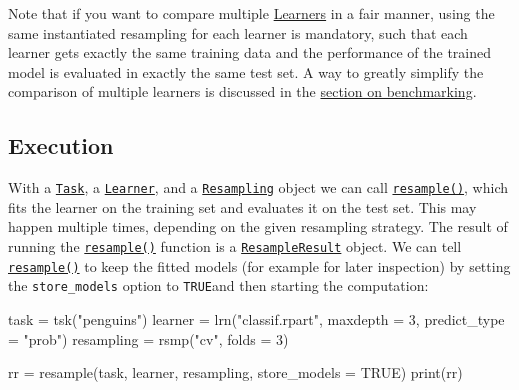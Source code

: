 \documentclass[
]{scrbook}
\newenvironment{Shaded}{\begin{snugshade}}{\end{snugshade}}
\newcommand{\AttributeTok}[1]{\textcolor[rgb]{0.77,0.63,0.00}{#1}}
\newcommand{\ConstantTok}[1]{\textcolor[rgb]{0.00,0.00,0.00}{#1}}
\newcommand{\DecValTok}[1]{\textcolor[rgb]{0.00,0.00,0.81}{#1}}
\newcommand{\FunctionTok}[1]{\textcolor[rgb]{0.00,0.00,0.00}{#1}}
\newcommand{\NormalTok}[1]{#1}
\newcommand{\OtherTok}[1]{\textcolor[rgb]{0.56,0.35,0.01}{#1}}
\newcommand{\StringTok}[1]{\textcolor[rgb]{0.31,0.60,0.02}{#1}}
\renewenvironment{Shaded} {\begin{snugshade}\small} {\end{snugshade}}
\begin{document}
Note that if you want to compare multiple \protect\hyperlink{learners}{Learners} in a fair manner, using the same instantiated resampling for each learner is mandatory, such that each learner gets exactly the same training data and the performance of the trained model is evaluated in exactly the same test set.
A way to greatly simplify the comparison of multiple learners is discussed in the \protect\hyperlink{benchmarking}{section on benchmarking}.

\hypertarget{resampling-exec}{%
\subsection{Execution}\label{resampling-exec}}

With a \href{https://mlr3.mlr-org.com/reference/Task.html}{\texttt{Task}}, a \href{https://mlr3.mlr-org.com/reference/Learner.html}{\texttt{Learner}}, and a \href{https://mlr3.mlr-org.com/reference/Resampling.html}{\texttt{Resampling}} object we can call \href{https://mlr3.mlr-org.com/reference/resample.html}{\texttt{resample()}}, which fits the learner on the training set and evaluates it on the test set.
This may happen multiple times, depending on the given resampling strategy.
The result of running the \href{https://mlr3.mlr-org.com/reference/resample.html}{\texttt{resample()}} function is a \href{https://mlr3.mlr-org.com/reference/ResampleResult.html}{\texttt{ResampleResult}} object.
We can tell \href{https://mlr3.mlr-org.com/reference/resample.html}{\texttt{resample()}} to keep the fitted models (for example for later inspection) by setting the \texttt{store\_models} option to \texttt{TRUE}and then starting the computation:

\begin{Shaded}
\begin{Highlighting}[]
\NormalTok{task }\OtherTok{=} \FunctionTok{tsk}\NormalTok{(}\StringTok{"penguins"}\NormalTok{)}
\NormalTok{learner }\OtherTok{=} \FunctionTok{lrn}\NormalTok{(}\StringTok{"classif.rpart"}\NormalTok{, }\AttributeTok{maxdepth =} \DecValTok{3}\NormalTok{, }\AttributeTok{predict\_type =} \StringTok{"prob"}\NormalTok{)}
\NormalTok{resampling }\OtherTok{=} \FunctionTok{rsmp}\NormalTok{(}\StringTok{"cv"}\NormalTok{, }\AttributeTok{folds =} \DecValTok{3}\NormalTok{)}

\NormalTok{rr }\OtherTok{=} \FunctionTok{resample}\NormalTok{(task, learner, resampling, }\AttributeTok{store\_models =} \ConstantTok{TRUE}\NormalTok{)}
\FunctionTok{print}\NormalTok{(rr)}
\end{Highlighting}
\end{Shaded}
\end{document}
